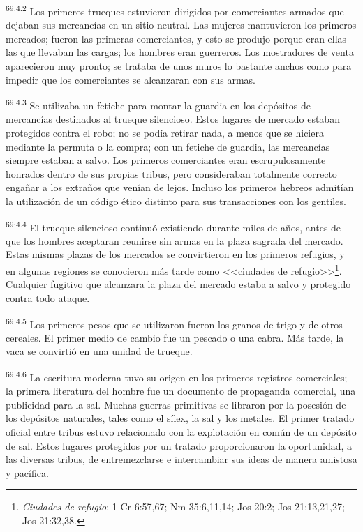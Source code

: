 \documentclass[twoside, 11pt]{book}
\begin{document}
\par
\textsuperscript{69:4.2} Los primeros trueques estuvieron dirigidos por comerciantes armados que dejaban sus mercancías en un sitio neutral. Las mujeres mantuvieron los primeros mercados; fueron las primeras comerciantes, y esto se produjo porque eran ellas las que llevaban las cargas; los hombres eran guerreros. Los mostradores de venta aparecieron muy pronto; se trataba de unos muros lo bastante anchos como para impedir que los comerciantes se alcanzaran con sus armas.

\par
\textsuperscript{69:4.3} Se utilizaba un fetiche para montar la guardia en los depósitos de mercancías destinados al trueque silencioso. Estos lugares de mercado estaban protegidos contra el robo; no se podía retirar nada, a menos que se hiciera mediante la permuta o la compra; con un fetiche de guardia, las mercancías siempre estaban a salvo. Los primeros comerciantes eran escrupulosamente honrados dentro de sus propias tribus, pero consideraban totalmente correcto engañar a los extraños que venían de lejos. Incluso los primeros hebreos admitían la utilización de un código ético distinto para sus transacciones con los gentiles.

\par
\textsuperscript{69:4.4} El trueque silencioso continuó existiendo durante miles de años, antes de que los hombres aceptaran reunirse sin armas en la plaza sagrada del mercado. Estas mismas plazas de los mercados se convirtieron en los primeros refugios, y en algunas regiones se conocieron más tarde como <<ciudades de refugio>>\footnote{\textit{Ciudades de refugio}: 1 Cr 6:57,67; Nm 35:6,11,14; Jos 20:2; Jos 21:13,21,27; Jos 21:32,38.}. Cualquier fugitivo que alcanzara la plaza del mercado estaba a salvo y protegido contra todo ataque.

\par
\textsuperscript{69:4.5} Los primeros pesos que se utilizaron fueron los granos de trigo y de otros cereales. El primer medio de cambio fue un pescado o una cabra. Más tarde, la vaca se convirtió en una unidad de trueque.

\par
\textsuperscript{69:4.6} La escritura moderna tuvo su origen en los primeros registros comerciales; la primera literatura del hombre fue un documento de propaganda comercial, una publicidad para la sal. Muchas guerras primitivas se libraron por la posesión de los depósitos naturales, tales como el sílex, la sal y los metales. El primer tratado oficial entre tribus estuvo relacionado con la explotación en común de un depósito de sal. Estos lugares protegidos por un tratado proporcionaron la oportunidad, a las diversas tribus, de entremezclarse e intercambiar sus ideas de manera amistosa y pacífica.
\end{document}
